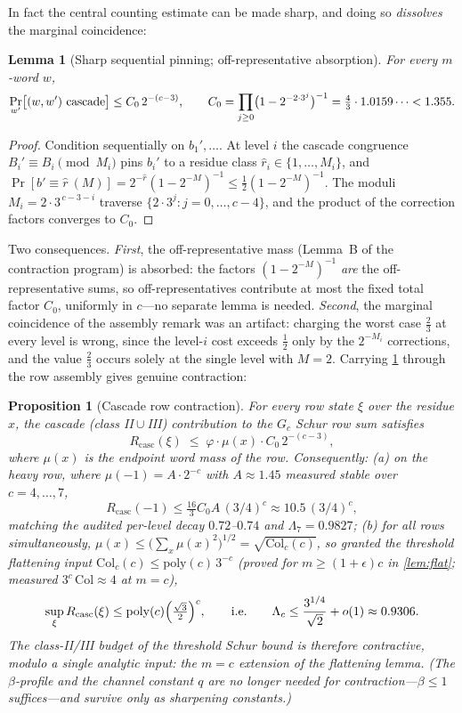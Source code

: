 \documentclass[11pt]{article}
\theoremstyle{plain}
\newtheorem{proposition}{Proposition}
\newtheorem{lemma}{Lemma}
\theoremstyle{definition}
\theoremstyle{remark}
\begin{document}
In fact the central counting estimate can be made sharp, and doing so
\emph{dissolves} the marginal coincidence:

\begin{lemma}[Sharp sequential pinning; off-representative absorption]
\label{lem:pinning}
For every $m$-word $w$,
\[
\Pr_{w'}\bigl[(w,w')\textnormal{ cascade}\bigr]
\le C_0\,2^{-(c-3)},
\qquad
C_0=\prod_{j\ge0}\bigl(1-2^{-2\cdot3^j}\bigr)^{-1}
=\tfrac43\cdot1.0159\cdots<1.355 .
\]
\end{lemma}

\begin{proof}
Condition sequentially on $b_1',\dots$. At level $i$ the cascade congruence
$B_i'\equiv B_i\pmod{M_i}$ pins $b_i'$ to a residue class
$\hat r_i\in\{1,\dots,M_i\}$, and
$\Pr[b'\equiv\hat r\ (M)]=2^{-\hat r}(1-2^{-M})^{-1}
\le\tfrac12(1-2^{-M})^{-1}$. The moduli $M_i=2\cdot3^{\,c-3-i}$ traverse
$\{2\cdot3^j:j=0,\dots,c-4\}$, and the product of the correction factors
converges to $C_0$.
\end{proof}

Two consequences. \emph{First}, the off-representative mass (Lemma~B of the
contraction program) is absorbed: the factors $(1-2^{-M})^{-1}$ \emph{are}
the off-representative sums, so off-representatives contribute at most the
fixed total factor $C_0$, uniformly in $c$---no separate lemma is needed.
\emph{Second}, the marginal coincidence of the assembly remark was an
artifact: charging the worst case $\tfrac23$ at every level is wrong, since
the level-$i$ cost exceeds $\tfrac12$ only by the $2^{-M_i}$ corrections,
and the value $\tfrac23$ occurs solely at the single level with $M=2$.
Carrying \cref{lem:pinning} through the row assembly gives genuine
contraction:

\begin{proposition}[Cascade row contraction]\label{prop:rowcontract}
For every row state $\xi$ over the residue $x$, the cascade (class
II${}\cup{}$III) contribution to the $G_c$ Schur row sum satisfies
\[
R_{\mathrm{casc}}(\xi)\;\le\;\varphi\cdot\mu(x)\cdot C_0\,2^{-(c-3)},
\]
where $\mu(x)$ is the endpoint word mass of the row. Consequently:
\emph{(a)} on the heavy row, where $\mu(-1)=A\cdot2^{-c}$ with
$A\approx1.45$ measured stable over $c=4,\dots,7$,
\[
R_{\mathrm{casc}}(-1)\le\tfrac{16}{3}C_0A\,(3/4)^c\approx10.5\,(3/4)^c,
\]
matching the audited per-level decay $0.72$--$0.74$ and $\Lambda_7=0.9827$;
\emph{(b)} for all rows simultaneously,
$\mu(x)\le\bigl(\sum_x\mu(x)^2\bigr)^{1/2}=\sqrt{\mathrm{Col}_c(c)}$, so
granted the threshold flattening input
$\mathrm{Col}_c(c)\le\mathrm{poly}(c)\,3^{-c}$ (proved for $m\ge(1+\epsilon)c$
in \cref{lem:flat}; measured $3^c\,\mathrm{Col}\approx4$ at $m=c$),
\[
\sup_\xi R_{\mathrm{casc}}(\xi)\le\mathrm{poly}(c)\Bigl(\tfrac{\sqrt3}2\Bigr)^{c},
\qquad\text{i.e.}\qquad
\Lambda_c\le\frac{3^{1/4}}{\sqrt2}+o(1)\approx0.9306 .
\]
The class-II/III budget of the threshold Schur bound is therefore
contractive, \emph{modulo a single analytic input}: the $m=c$ extension of
the flattening lemma. (The $\beta$-profile and the channel constant $q$ are
no longer needed for contraction---$\beta\le1$ suffices---and survive only
as sharpening constants.)
\end{proposition}
\end{document}
